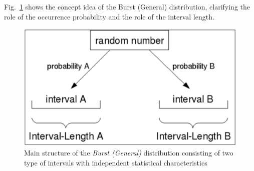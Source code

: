 Fig.~\ref{fig:strburdistr} shows the concept idea of the Burst
(General) distribution, clarifying the role of the occurrence
probability and the role of the interval length.
\begin{figure}[htb]
    \begin{center}
        \includegraphics[scale=.5]{img/jsimg/4.1.eps}
    \end{center}
    \caption{Main structure of the \emph{Burst (General)} distribution consisting
    of two type of intervals with independent statistical characteristics}
    \label{fig:strburdistr}
\end{figure}\\

